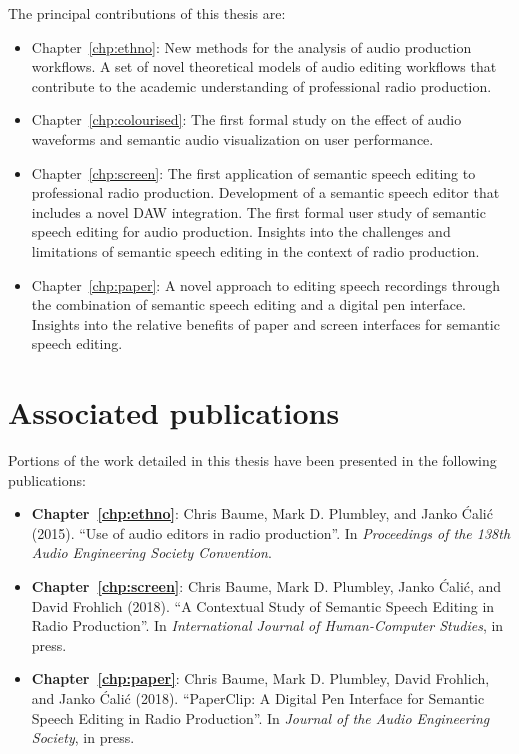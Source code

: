 The principal contributions of this thesis are:
\begin{itemize}
  \item Chapter~\ref{chp:ethno}: 
    New methods for the analysis of audio production workflows. A set of novel theoretical models of audio editing
    workflows that contribute to the academic understanding of professional radio production.
  \item Chapter~\ref{chp:colourised}: 
    The first formal study on the effect of audio waveforms and semantic audio visualization on user performance.
  \item Chapter~\ref{chp:screen}: 
    The first application of semantic speech editing to professional radio production. Development of a semantic speech
    editor that includes a novel DAW integration. The first formal user study of semantic speech editing for audio
    production. Insights into the challenges and limitations of semantic speech editing in the context of radio
    production. 
  \item Chapter~\ref{chp:paper}:
    A novel approach to editing speech recordings through the combination of semantic speech editing and a digital pen
    interface. Insights into the relative benefits of paper and screen interfaces for semantic speech editing.
\end{itemize}

\section{Associated publications}\label{sec:intro-publications}

Portions of the work detailed in this thesis have been presented in the following publications:


\nocite{Baume2015,Baume2018a,Baume2018}
\begin{itemize}
  \item \textbf{Chapter~\ref{chp:ethno}}: Chris Baume, Mark D. Plumbley, and Janko \'{C}ali\'{c} (2015). ``Use of audio
    editors in radio production''. In \textit{Proceedings of the 138th Audio Engineering Society Convention}.
  \item \textbf{Chapter~\ref{chp:screen}}: Chris Baume, Mark D. Plumbley, Janko \'{C}ali\'{c}, and David Frohlich
    (2018). ``A Contextual Study of Semantic Speech Editing in Radio Production''. In \textit{International Journal of
    Human-Computer Studies}, in press.
  \item \textbf{Chapter~\ref{chp:paper}}: Chris Baume, Mark D. Plumbley, David Frohlich, and Janko \'{C}ali\'{c}
    (2018).  ``PaperClip: A Digital Pen Interface for Semantic Speech Editing in Radio Production''. In \textit{Journal
    of the Audio Engineering Society}, in press.   
\end{itemize}

